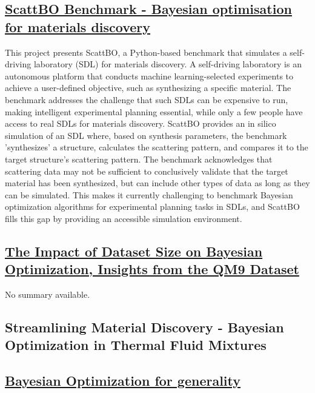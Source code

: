 \subsection*{\href{https://twitter.com/SodeAndy/status/1773474538631651769}{ScattBO Benchmark - Bayesian optimisation for materials discovery}}

This project presents ScattBO, a Python-based benchmark that simulates a self-driving laboratory (SDL) for materials discovery. A self-driving laboratory is an autonomous platform that conducts machine learning-selected experiments to achieve a user-defined objective, such as synthesizing a specific material\cite{szymanski_autonomous_2023}. The benchmark addresses the challenge that such SDLs can be expensive to run, making intelligent experimental planning essential, while only a few people have access to real SDLs for materials discovery. ScattBO provides an in silico simulation of an SDL where, based on synthesis parameters, the benchmark 'synthesizes' a structure, calculates the scattering pattern\cite{johansen_gpu-accelerated_2024}, and compares it to the target structure's scattering pattern. The benchmark acknowledges that scattering data may not be sufficient to conclusively validate that the target material has been synthesized\cite{leeman_challenges_2024}, but can include other types of data as long as they can be simulated. This makes it currently challenging to benchmark Bayesian optimization algorithms for experimental planning tasks in SDLs, and ScattBO fills this gap by providing an accessible simulation environment.
 \subsection*{\href{https://www.youtube.com/watch?v=hvODyYejxuc}{The Impact of Dataset Size on Bayesian Optimization, Insights from the QM9 Dataset}}

No summary available.
 \subsection*{Streamlining Material Discovery - Bayesian Optimization in Thermal Fluid Mixtures}


 \subsection*{\href{https://www.youtube.com/watch?v=wfSyIudptfc}{Bayesian Optimization for generality}}

